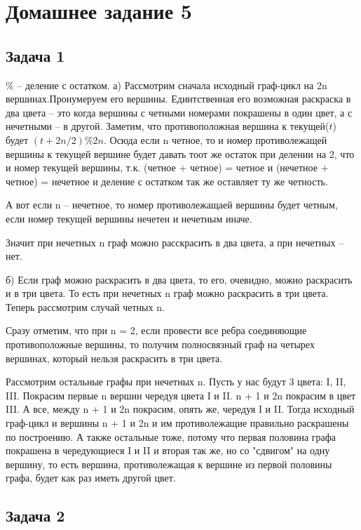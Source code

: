 

	\section{Домашнее задание 5} 
	\subsection{Задача 1}
	\% -- деление с остатком.
	а) Рассмотрим сначала исходный граф-цикл на 2n вершинах.Пронумеруем его вершины. Единтственная его возможная раскраска в два цвета -- это когда вершины с четными номерами покрашены в один цвет, а с нечетными -- в другой. Заметим, что противоположная вершина к текущей($t$) будет $(t + 2n/2) \% 2n$.  Осюда если n четное, то и номер противолежащей вершины к текущей вершине будет давать тоот же остаток при делении на 2, что и номер текущей вершины, т.к. (четное + четное) = четное и (нечетное + четное) = нечетное и деление с остатком так же оставляет ту же четность. 
	
	А вот если n -- нечетное, то номер противолежащаей вершины будет четным, если номер текущей вершины нечетен и нечетным иначе. 
	
	Значит при нечетных n граф можно расскрасить в два цвета, а при нечетных -- нет. 
	
	б) Если граф можно раскрасить в два цвета, то его, очевидно, можно раскрасить и в три цвета. То есть при нечетных n граф можно раскрасить в три цвета. Теперь рассмотрим случай четных n.
	
	Сразу отметим, что при n = 2, если провести все ребра соединяющие противоположные вершины, то получим полносвязный граф на четырех вершинах, который нельзя раскрасить в три цвета.
	
	Рассмотрим остальные графы при нечетных n. Пусть у нас будут 3 цвета: I, II, III.
	Покрасим первые n вершин чередуя цвета I и II. n + 1 и 2n покрасим в цвет III. А все, между n + 1 и 2n покрасим, опять же, чередуя I и II. Тогда исходный граф-цикл и вершины n + 1 и 2n и им противолежащие правильно раскрашены по построению. А также остальные тоже, потому что первая половина графа покрашена в чередующиеся I и II и вторая так же, но со "сдвигом" на одну вершину, то есть вершина, противолежащая к вершине из первой половины графа, будет как раз иметь другой цвет.   
	
	\subsection{Задача 2}
	
